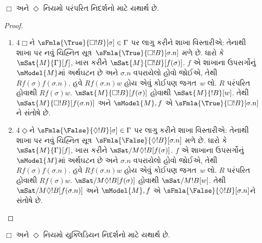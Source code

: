 \begin{prop}
  $\Box$%
   અને %
  $\Diamond$
  નિયમો
  પરંપરિત નિદર્શનો માટે યથાર્થ છે.
\end{prop}

\begin{proof}
\begin{enumerate}
\item 4$\Box$ને
  $\sFmla{\True}{\Box !B}[\sigma] \in \Gamma$ પર લાગુ કરીને
  શાખા વિસ્તારીએ:
  તેનાથી શાખા પર નવું ચિહ્નિત સૂત્ર~$\sFmla{\True}{\Box!B}[\sigma.n]$ મળે છે.
    ધારો કે $\mSat{M}{\Gamma}[f]$, ખાસ કરીને
    $\mSat{M}{\Box !B}[f(\sigma)]$. $f$ એ શાખાના
    ઉપસર્ગોનું~$\mModel{M}$માં અર્થઘટન છે અને $\sigma.n$
    વપરાયેલો હોવો જોઈએ, તેથી $Rf(\sigma)f(\sigma.n)$.
    હવે $Rf(\sigma.n)w$ હોય એવું કોઈપણ જગત~$w$ લો.
    $R$ પરંપરિત હોવાથી $Rf(\sigma)w$.
    $\mSat{M}{\Box !B}[f(\sigma)]$ હોવાથી
    $\mSat{M}{!B}[w]$. તેથી
    $\mSat{M}{\Box !B}[f(\sigma.n)]$ અને $\mModel{M}, f$ એ
    $\sFmla{\True}{\Box !B}[\sigma.n]$ને સંતોષે છે.
\item 4$\Diamond$ને
  $\sFmla{\False}{\Diamond !B}[\sigma] \in \Gamma$ પર લાગુ
  કરીને શાખા વિસ્તારીએ:
  તેનાથી શાખા પર નવું ચિહ્નિત સૂત્ર~$\sFmla{\False}{\Diamond!B}[\sigma.n]$ મળે છે.
    ધારો કે $\mSat{M}{\Gamma}[f]$, ખાસ કરીને
    $\mSat/{M}{\Diamond !B}[f(\sigma)]$. $f$ એ શાખાના
    ઉપસર્ગોનું~$\mModel{M}$માં અર્થઘટન છે અને $\sigma.n$
    વપરાયેલો હોવો જોઈએ, તેથી $Rf(\sigma)f(\sigma.n)$.
    હવે $Rf(\sigma.n)w$ હોય એવું કોઈપણ જગત~$w$ લો.
    $R$ પરંપરિત હોવાથી $Rf(\sigma)w$.
    $\mSat/{M}{\Diamond !B}[f(\sigma)]$ હોવાથી
    $\mSat/{M}{!B}[w]$. તેથી
    $\mSat/{M}{\Diamond !B}[f(\sigma.n)]$ અને $\mModel{M}, f$ એ
    $\sFmla{\False}{\Diamond !B}[\sigma.n]$ને સંતોષે છે.
\end{enumerate}
\end{proof}



\begin{prop}
  $\Box$%
   અને %
  $\Diamond$
  નિયમો
  યુક્લિડિયન નિદર્શનો માટે યથાર્થ છે.
\end{prop}

